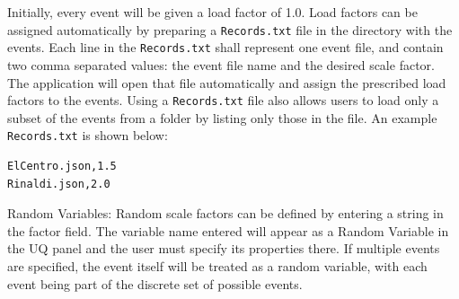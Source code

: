 Initially, every
event will be given a load factor of 1.0. Load factors can be assigned automatically by preparing a \texttt{Records.txt} file in the directory with the events. Each line in the \texttt{Records.txt} shall represent one event file, and contain two comma separated values: the event file name and the desired scale factor. The application will open that file automatically and assign the prescribed load factors to the events. Using a \texttt{Records.txt} file also allows users to load only a subset of the events from a folder by listing only those in the file. An example \texttt{Records.txt} is shown below:

\begin{verbatim}
ElCentro.json,1.5
Rinaldi.json,2.0
\end{verbatim}

Random Variables: Random scale factors can be defined by entering a string in the factor field. The variable name entered will appear as a Random Variable in the UQ panel and the user must specify its properties there. If multiple
events are specified, the event itself will be treated as a random
variable, with each event being part of the discrete set of possible
events.